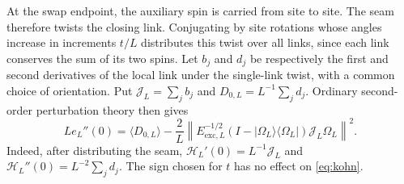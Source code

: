 At the swap endpoint, the auxiliary spin is carried from site to site.
The seam therefore twists the closing link. Conjugating by site rotations
whose angles increase in increments \(t/L\) distributes this twist over
all links, since each link conserves the sum of its two spins. Let
\(b_j\) and \(d_j\) be respectively the first and second derivatives of
the local link under the single-link twist, with a common choice of
orientation. Put \(\mathcal J_L=\sum_j b_j\) and
\(D_{0,L}=L^{-1}\sum_j d_j\).
Ordinary second-order perturbation theory then gives
\begin{equation}\label{eq:kohn}
 L e_L''(0)=\langle D_{0,L}\rangle
 -\frac2L
 \left\|E_{\mathrm{exc},L}^{-1/2}
       (I-|\Omega_L\rangle\langle\Omega_L|)\mathcal J_L\Omega_L\right\|^2 .
\end{equation}
Indeed, after distributing the seam,
\(\mathcal H_L'(0)=L^{-1}\mathcal J_L\) and
\(\mathcal H_L''(0)=L^{-2}\sum_jd_j\).
The sign chosen for \(t\) has no effect on \eqref{eq:kohn}.

